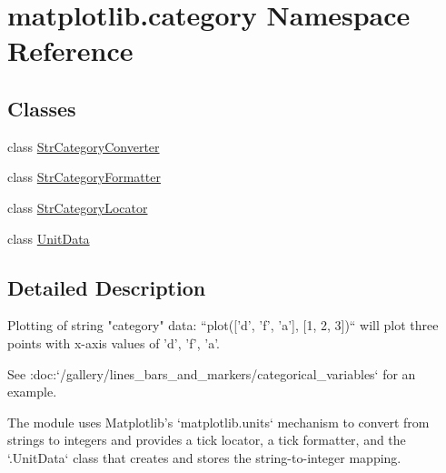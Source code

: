 \hypertarget{namespacematplotlib_1_1category}{}\section{matplotlib.\+category Namespace Reference}
\label{namespacematplotlib_1_1category}
\subsection*{Classes}
\begin{DoxyCompactItemize}
\item 
class \hyperlink{classmatplotlib_1_1category_1_1StrCategoryConverter}{Str\+Category\+Converter}
\item 
class \hyperlink{classmatplotlib_1_1category_1_1StrCategoryFormatter}{Str\+Category\+Formatter}
\item 
class \hyperlink{classmatplotlib_1_1category_1_1StrCategoryLocator}{Str\+Category\+Locator}
\item 
class \hyperlink{classmatplotlib_1_1category_1_1UnitData}{Unit\+Data}
\end{DoxyCompactItemize}


\subsection{Detailed Description}
\begin{DoxyVerb}Plotting of string "category" data: ``plot(['d', 'f', 'a'], [1, 2, 3])`` will
plot three points with x-axis values of 'd', 'f', 'a'.

See :doc:`/gallery/lines_bars_and_markers/categorical_variables` for an
example.

The module uses Matplotlib's `matplotlib.units` mechanism to convert from
strings to integers and provides a tick locator, a tick formatter, and the
`.UnitData` class that creates and stores the string-to-integer mapping.
\end{DoxyVerb}
 